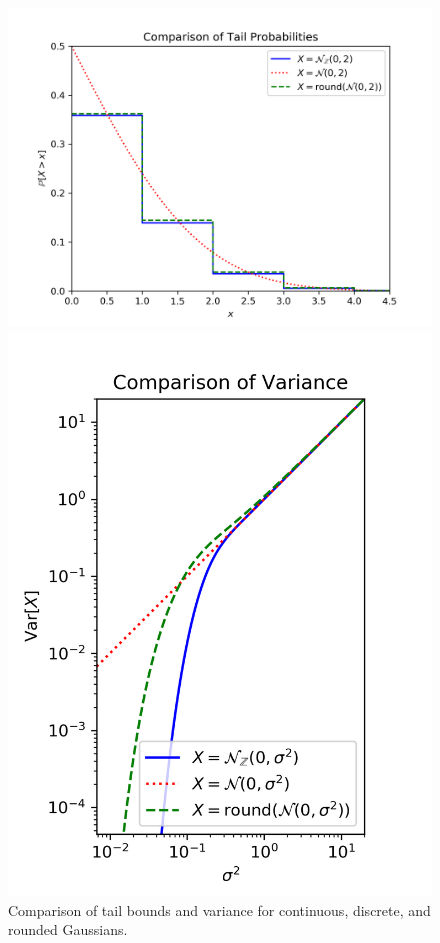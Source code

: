 \documentclass{jpcfinal} %
\begin{document}
\begin{figure}[h!]
    \centering
    \begin{minipage}{0.64\textwidth}
        \includegraphics[width=\textwidth]{dg_tail.png}
    \end{minipage}
    \hspace{-10pt}
    \begin{minipage}{0.36\textwidth}
        \includegraphics[width=\textwidth]{dg_var.png}
    \end{minipage}
    \caption{Comparison of tail bounds and variance for continuous, discrete, and rounded Gaussians.}
    \label{fig:plots}
\end{figure}
\end{document}
